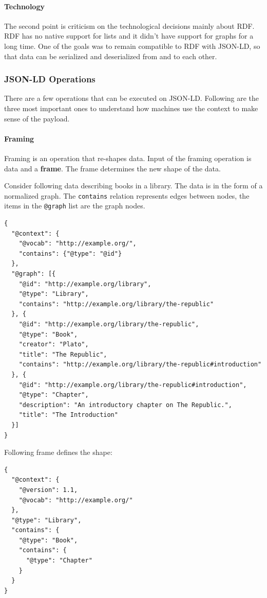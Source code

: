 \paragraph{Technology}
The second point is criticism on the technological decisions mainly about RDF. RDF has no native support for lists and it didn't have support for graphs for a long time. One of the goals was to remain compatible to RDF with JSON-LD, so that data can be serialized and deserialized from and to each other. \citep{semanticwebrevisited}

\subsubsection{JSON-LD Operations}
There are a few operations that can be executed on JSON-LD. Following are the three most important ones to understand how machines use the context to make sense of the payload.

\paragraph{Framing}
Framing is an operation that re-shapes data. Input of the framing operation is data and a \textbf{frame}. The frame determines the new shape of the data.

Consider following data describing books in a library. The data is in the form of a normalized graph. The \lstinline{contains} relation represents edges between nodes, the items in the \lstinline{@graph} list are the graph nodes.

\lstset{language=JSON}
\begin{lstlisting}[caption=Data of a library as normalized graph]
{
  "@context": {
    "@vocab": "http://example.org/",
    "contains": {"@type": "@id"}
  },
  "@graph": [{
    "@id": "http://example.org/library",
    "@type": "Library",
    "contains": "http://example.org/library/the-republic"
  }, {
    "@id": "http://example.org/library/the-republic",
    "@type": "Book",
    "creator": "Plato",
    "title": "The Republic",
    "contains": "http://example.org/library/the-republic#introduction"
  }, {
    "@id": "http://example.org/library/the-republic#introduction",
    "@type": "Chapter",
    "description": "An introductory chapter on The Republic.",
    "title": "The Introduction"
  }]
}
\end{lstlisting}

Following frame defines the shape:

\lstset{language=JSON}
\begin{lstlisting}[caption=Frame for the framing operation]
{
  "@context": {
    "@version": 1.1,
    "@vocab": "http://example.org/"
  },
  "@type": "Library",
  "contains": {
    "@type": "Book",
    "contains": {
      "@type": "Chapter"
    }
  }
}
\end{lstlisting}

